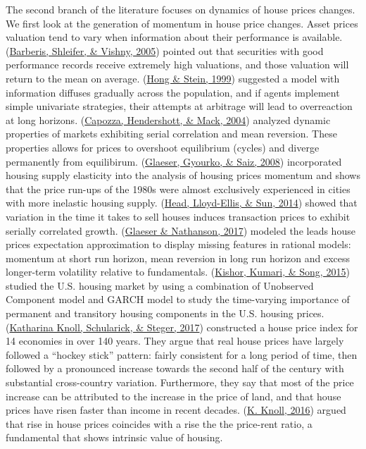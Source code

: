 \documentclass[
  12pt,
]{article}
\begin{document}
The second branch of the literature focuses on dynamics of house prices changes. We first look at the generation of momentum in house price changes. Asset prices valuation tend to vary when information about their performance is available. (\protect\hyperlink{ref-thaler_chapter_2005}{Barberis, Shleifer, \& Vishny, 2005}) pointed out that securities with good performance records receive extremely high valuations, and those valuation will return to the mean on average. (\protect\hyperlink{ref-hong_unified_1999}{Hong \& Stein, 1999}) suggested a model with information diffuses gradually across the population, and if agents implement simple univariate strategies, their attempts at arbitrage will lead to overreaction at long horizons. (\protect\hyperlink{ref-capozza_anatomy_2004}{Capozza, Hendershott, \& Mack, 2004}) analyzed dynamic properties of markets exhibiting serial correlation and mean reversion. These properties allows for prices to overshoot equilibrium (cycles) and diverge permanently from equilibirum. (\protect\hyperlink{ref-glaeser_housing_2008}{Glaeser, Gyourko, \& Saiz, 2008}) incorporated housing supply elasticity into the analysis of housing prices momentum and shows that the price run-ups of the 1980s were almost exclusively experienced in cities with more inelastic housing supply. (\protect\hyperlink{ref-head_search_2014}{Head, Lloyd-Ellis, \& Sun, 2014}) showed that variation in the time it takes to sell houses induces transaction prices to exhibit serially correlated growth. (\protect\hyperlink{ref-glaeser_extrapolative_2017}{Glaeser \& Nathanson, 2017}) modeled the leads house prices expectation approximation to display missing features in rational models: momentum at short run horizon, mean reversion in long run horizon and excess longer-term volatility relative to fundamentals. (\protect\hyperlink{ref-kishor_time_2015}{Kishor, Kumari, \& Song, 2015}) studied the U.S. housing market by using a combination of Unobserved Component model and GARCH model to study the time-varying importance of permanent and transitory housing components in the U.S. housing prices. (\protect\hyperlink{ref-knoll_no_2017}{Katharina Knoll, Schularick, \& Steger, 2017}) constructed a house price index for 14 economies in over 140 years. They argue that real house prices have largely followed a ``hockey stick'' pattern: fairly consistent for a long period of time, then followed by a pronounced increase towards the second half of the century with substantial cross-country variation. Furthermore, they say that most of the price increase can be attributed to the increase in the price of land, and that house prices have risen faster than income in recent decades. (\protect\hyperlink{ref-knoll_return_2016}{K. Knoll, 2016}) argued that rise in house prices coincides with a rise the the price-rent ratio, a fundamental that shows intrinsic value of housing.
\end{document}
